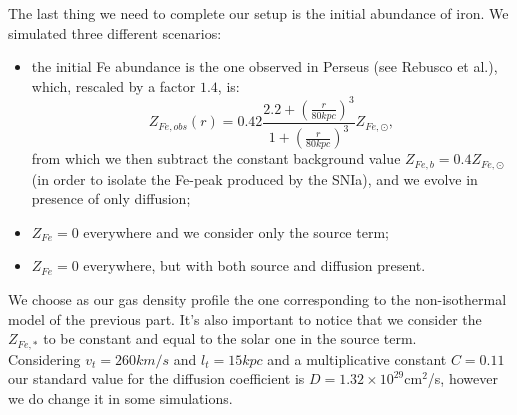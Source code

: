 \documentclass{article}
\begin{document}
The last thing we need to complete our setup is the initial abundance of iron. We simulated three different scenarios:
\begin{itemize}
	\item the initial Fe abundance is the one observed in Perseus (see Rebusco et al.\cite{rebusco}), which, rescaled by a factor $1.4$, is:
			\begin{equation}\label{Feab}
				Z_{Fe,obs}(r)=0.42\frac{2.2+(\frac{r}{80 kpc})^{3}}{1+(\frac{r}{80 kpc})^{3}}Z_{Fe,\odot},
			\end{equation}
			from which we then subtract the constant background value $Z_{Fe,b}=0.4Z_{Fe,\odot}$ (in order to isolate the Fe-peak produced by the SNIa), and we evolve in presence of only diffusion;
	\item  $Z_{Fe}=0$ everywhere and we consider only the source term;
	\item  $Z_{Fe}=0$ everywhere, but with both source and diffusion present.
\end{itemize}
We choose as our gas density profile the one corresponding to the non-isothermal model of the previous part. It's also important to notice that we consider the $Z_{Fe,*}$ to be constant and equal to the solar one in the source term.\\
Considering $v_{t}=260 km/s$ and $l_{t}=15kpc$ and a multiplicative constant $C=0.11$ our standard value for the diffusion coefficient is $D=1.32\times 10^{29}$cm$^{2}$/s, however we do change it in some simulations.
\end{document}
